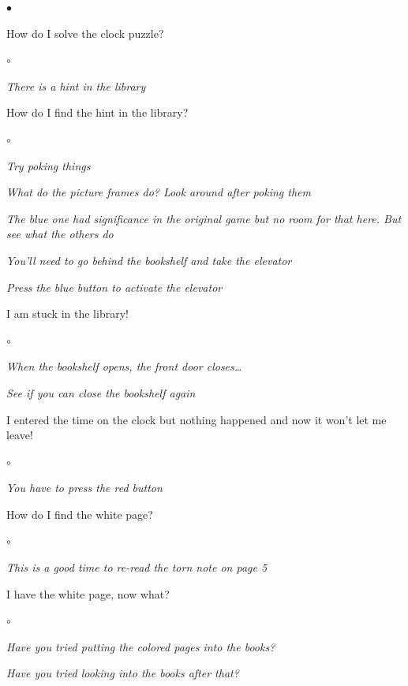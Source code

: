 \documentclass{book}
\newenvironment{list1}%
{\begin{list}{$\bullet$}{\setlength{\parsep}{0.05ex}\setlength{\itemsep}{0mm}}}
{\end{list}\normalsize}
\newenvironment{list2}%
{\begin{list}{$\circ$}{\setlength{\parsep}{0.05ex}\setlength{\itemsep}{0mm}}}
{\end{list}\normalsize}
\begin{document}
\begin{list1}
\pagebreak

	\item How do I solve the clock puzzle?
	\begin{list2}
		\item {\em There is a hint in the library}
	\end{list2}

	\item How do I find the hint in the library?
	\begin{list2}
		\item {\em Try poking things}
		\item {\em What do the picture frames do? Look around after
			poking them}
		\item {\em The blue one had significance in the original game
		but no room for that here.  But see what the others do}
		\item {\em You'll need to go behind the bookshelf and take the
		elevator}
		\item {\em Press the blue button to activate the elevator}
	\end{list2}

	\item I am stuck in the library!
		\begin{list2}
		\item {\em When the bookshelf opens, the front door closes\dots}
		\item {\em See if you can close the bookshelf again}
		\end{list2}

	\item I entered the time on the clock but nothing happened and now
		it won't let me leave!
		\begin{list2}
		\item {\em You have to press the red button}
		\end{list2}

	\item How do I find the white page?
		\begin{list2}
		\item {\em This is a good time to re-read the torn note on page 5}
		\end{list2}

	\item I have the white page, now what?
		\begin{list2}
		\item {\em Have you tried putting the colored pages 
			into the books?}
		\item {\em Have you tried looking into the books after that?}
		\end{list2}


\end{list1}
\end{document}
